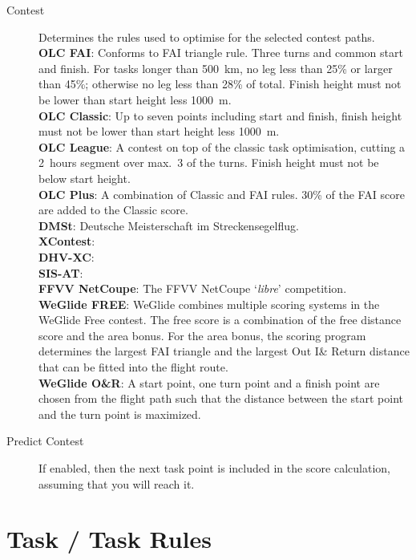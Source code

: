 \begin{description}
\item[Contest]  Determines the rules used to optimise for the selected contest 
  paths. \\
  {\bf OLC FAI}: Conforms to FAI triangle rule. Three turns and common start and 
  finish.  For tasks longer than
  500~km, no leg less than 25\% or larger than 45\%; otherwise no leg less than 28\%
  of total.  Finish height must not be lower than start height less 1000~m. \\
  {\bf OLC Classic}: Up to seven points including start and finish, finish height
  must not be lower than start height less 1000~m. \\
  {\bf OLC League}: A contest on top of the classic task optimisation, cutting
  a 2~hours segment over max.\ 3 of the turns. Finish height must not be below
  start height. \\
  {\bf OLC Plus}: A combination of Classic and FAI rules. 30\% of the FAI score
  are added to the Classic score. \\
  {\bf DMSt}: Deutsche Meisterschaft im Streckensegelflug. \\
  {\bf XContest}:  \\
  {\bf DHV-XC}:  \\
  {\bf SIS-AT}:  \\
  {\bf FFVV NetCoupe}: The FFVV NetCoupe `{\it libre}' competition. \\
  {\bf WeGlide FREE}: WeGlide combines multiple scoring systems in the WeGlide Free contest. The free score is a combination of the free distance score and the area bonus. For the area bonus, the scoring program determines the largest FAI triangle and the largest Out I\& Return distance that can be fitted into the flight route. \\
  {\bf WeGlide O\&R}: A start point, one turn point and a finish point are chosen from the flight path such that the distance between the start point and the turn point is maximized. \\
\item[Predict Contest]  If enabled, then the next task point is included in the 
  score calculation, assuming that you will reach it.
\end{description}


\section{Task / Task Rules}

